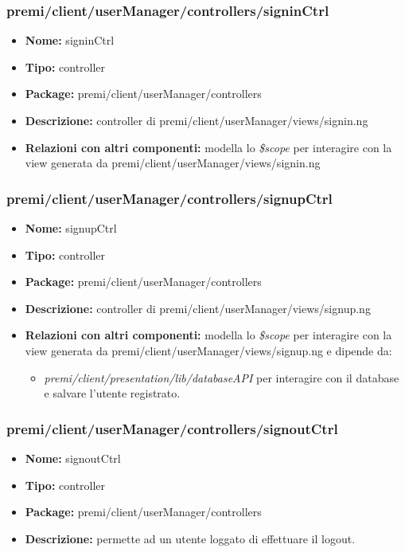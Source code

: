 \subsubsection{premi/client/userManager/controllers/signinCtrl}
\begin{itemize}
  \item[] \textbf{Nome:} signinCtrl
  \item[] \textbf{Tipo:} controller
  \item[] \textbf{Package:} premi/client/userManager/controllers
  \item[] \textbf{Descrizione:} controller di premi/client/userManager/views/signin.ng
  \item[] \textbf{Relazioni con altri componenti:} modella lo \textit{\$scope} per interagire con la view generata da premi/client/userManager/views/signin.ng
\end{itemize}

\subsubsection{premi/client/userManager/controllers/signupCtrl}
\begin{itemize}
  \item[] \textbf{Nome:} signupCtrl
  \item[] \textbf{Tipo:} controller
  \item[] \textbf{Package:} premi/client/userManager/controllers
  \item[] \textbf{Descrizione:} controller di premi/client/userManager/views/signup.ng
  \item[] \textbf{Relazioni con altri componenti:} modella lo \textit{\$scope} per interagire con la view generata da premi/client/userManager/views/signup.ng e dipende da:
  \begin{itemize}
   \item \textit{premi/client/presentation/lib/databaseAPI} per interagire con il database e salvare l'utente registrato.
  \end{itemize}
\end{itemize}

\subsubsection{premi/client/userManager/controllers/signoutCtrl}
\begin{itemize}
  \item[] \textbf{Nome:} signoutCtrl
  \item[] \textbf{Tipo:} controller
  \item[] \textbf{Package:} premi/client/userManager/controllers
  \item[] \textbf{Descrizione:} permette ad un utente loggato di effettuare il logout.
\end{itemize}

